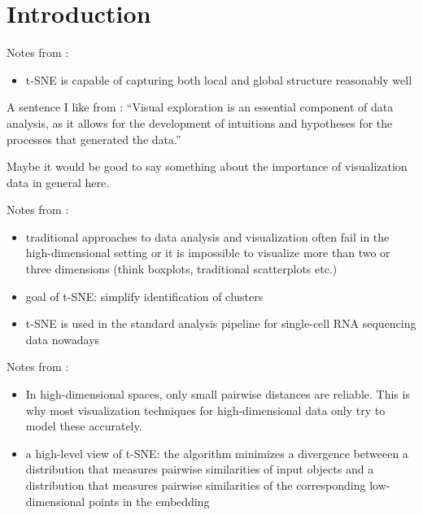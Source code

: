 \chapter{Introduction}
Notes from \cite{vdMaa08}: 
\begin{itemize}
    \item t-SNE is capable of capturing both local and global structure reasonably well 
\end{itemize}
A sentence I like from \cite{vdMaa14}: \enquote{Visual exploration is an essential component of data analysis, as it allows for the development of intuitions and hypotheses for the processes that generated the data.}


Maybe it would be good to say something about the importance of visualization data in general here. 

Notes from \cite{LinStei22}:
\begin{itemize}
    \item traditional approaches to data analysis and visualization often fail in the high-dimen\-sio\-nal setting or it is impossible to visualize more than two or three dimensions (think boxplots, traditional scatterplots etc.)
    \item goal of t-SNE: simplify identification of clusters 
    \item t-SNE is used in the standard analysis pipeline for single-cell RNA sequencing data nowadays
\end{itemize}

Notes from \cite{vdMaa14}:
\begin{itemize}
    \item In high-dimensional spaces, only small pairwise distances are reliable. This is why most visualization techniques for high-dimensional data only try to model these accurately. 
    \item a high-level view of t-SNE: the algorithm minimizes a divergence betweeen a distribution that measures pairwise similarities of input objects and a distribution that measures pairwise similarities of the corresponding low-dimensional points in the embedding 
\end{itemize}